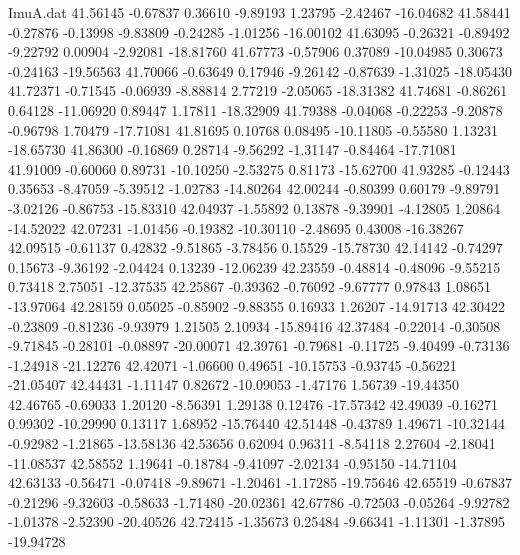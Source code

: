 \begin{filecontents}{ImuA.dat}
  41.56145   -0.67837    0.36610   -9.89193    1.23795   -2.42467  -16.04682
  41.58441   -0.27876   -0.13998   -9.83809   -0.24285   -1.01256  -16.00102
  41.63095   -0.26321   -0.89492   -9.22792    0.00904   -2.92081  -18.81760
  41.67773   -0.57906    0.37089  -10.04985    0.30673   -0.24163  -19.56563
  41.70066   -0.63649    0.17946   -9.26142   -0.87639   -1.31025  -18.05430
  41.72371   -0.71545   -0.06939   -8.88814    2.77219   -2.05065  -18.31382
  41.74681   -0.86261    0.64128  -11.06920    0.89447    1.17811  -18.32909
  41.79388   -0.04068   -0.22253   -9.20878   -0.96798    1.70479  -17.71081
  41.81695    0.10768    0.08495  -10.11805   -0.55580    1.13231  -18.65730
  41.86300   -0.16869    0.28714   -9.56292   -1.31147   -0.84464  -17.71081
  41.91009   -0.60060    0.89731  -10.10250   -2.53275    0.81173  -15.62700
  41.93285   -0.12443    0.35653   -8.47059   -5.39512   -1.02783  -14.80264
  42.00244   -0.80399    0.60179   -9.89791   -3.02126   -0.86753  -15.83310
  42.04937   -1.55892    0.13878   -9.39901   -4.12805    1.20864  -14.52022
  42.07231   -1.01456   -0.19382  -10.30110   -2.48695    0.43008  -16.38267
  42.09515   -0.61137    0.42832   -9.51865   -3.78456    0.15529  -15.78730
  42.14142   -0.74297    0.15673   -9.36192   -2.04424    0.13239  -12.06239
  42.23559   -0.48814   -0.48096   -9.55215    0.73418    2.75051  -12.37535
  42.25867   -0.39362   -0.76092   -9.67777    0.97843    1.08651  -13.97064
  42.28159    0.05025   -0.85902   -9.88355    0.16933    1.26207  -14.91713
  42.30422   -0.23809   -0.81236   -9.93979    1.21505    2.10934  -15.89416
  42.37484   -0.22014   -0.30508   -9.71845   -0.28101   -0.08897  -20.00071
  42.39761   -0.79681   -0.11725   -9.40499   -0.73136   -1.24918  -21.12276
  42.42071   -1.06600    0.49651  -10.15753   -0.93745   -0.56221  -21.05407
  42.44431   -1.11147    0.82672  -10.09053   -1.47176    1.56739  -19.44350
  42.46765   -0.69033    1.20120   -8.56391    1.29138    0.12476  -17.57342
  42.49039   -0.16271    0.99302  -10.29990    0.13117    1.68952  -15.76440
  42.51448   -0.43789    1.49671  -10.32144   -0.92982   -1.21865  -13.58136
  42.53656    0.62094    0.96311   -8.54118    2.27604   -2.18041  -11.08537
  42.58552    1.19641   -0.18784   -9.41097   -2.02134   -0.95150  -14.71104
  42.63133   -0.56471   -0.07418   -9.89671   -1.20461   -1.17285  -19.75646
  42.65519   -0.67837   -0.21296   -9.32603   -0.58633   -1.71480  -20.02361
  42.67786   -0.72503   -0.05264   -9.92782   -1.01378   -2.52390  -20.40526
  42.72415   -1.35673    0.25484   -9.66341   -1.11301   -1.37895  -19.94728

\end{filecontents}
